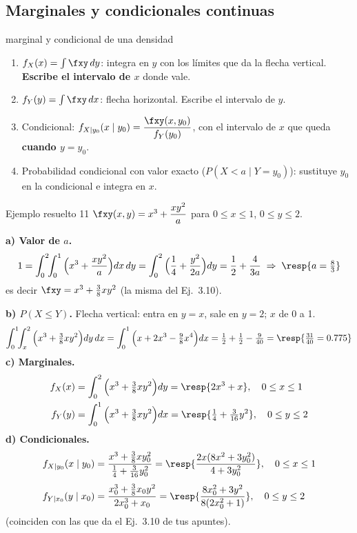 \subsection{Marginales y condicionales continuas}

\begin{receta}{marginal y condicional de una densidad}
\begin{enumerate}
\item $f_X(x)=\int \fxy\,dy$: integra en $y$ con los l\'imites que da la flecha vertical. \textbf{Escribe el intervalo de $x$} donde vale.
\item $f_Y(y)=\int \fxy\,dx$: flecha horizontal. Escribe el intervalo de $y$.
\item Condicional: $f_{X\mid y_0}(x\mid y_0)=\dfrac{\fxy(x,y_0)}{f_Y(y_0)}$, con el intervalo de $x$ que queda \textbf{cuando $y=y_0$}.
\item Probabilidad condicional con valor exacto ($P(X<a\mid Y=y_0)$): sustituye $y_0$ en la condicional e integra en $x$.
\end{enumerate}
\end{receta}

\begin{ejemplo}{Ejemplo resuelto 11 }
$\fxy(x,y)=x^3+\dfrac{xy^2}{a}$ para $0\le x\le1$, $0\le y\le2$.

\textbf{a) Valor de $a$.}
\[
1=\int_0^2\!\!\int_0^1\Big(x^3+\frac{xy^2}{a}\Big)dx\,dy=\int_0^2\Big(\frac14+\frac{y^2}{2a}\Big)dy=\frac12+\frac{4}{3a}
\;\Rightarrow\;\resp{a=\tfrac83}
\]
es decir $\fxy=x^3+\tfrac38xy^2$ (la misma del Ej.~3.10).

\textbf{b) $P(X\le Y)$.} Flecha vertical: entra en $y=x$, sale en $y=2$; $x$ de 0 a 1.
\[
\int_0^1\!\!\int_x^2\Big(x^3+\tfrac38xy^2\Big)dy\,dx=\int_0^1\Big(x+2x^3-\tfrac98x^4\Big)dx=\tfrac12+\tfrac12-\tfrac{9}{40}=\resp{\tfrac{31}{40}=0.775}
\]
\textbf{c) Marginales.}
\begin{align*}
f_X(x)&=\int_0^2\Big(x^3+\tfrac38xy^2\Big)dy=\resp{2x^3+x},\quad 0\le x\le1\\
f_Y(y)&=\int_0^1\Big(x^3+\tfrac38xy^2\Big)dx=\resp{\tfrac14+\tfrac{3}{16}y^2},\quad 0\le y\le2
\end{align*}
\textbf{d) Condicionales.}
\begin{align*}
f_{X\mid y_0}(x\mid y_0)&=\frac{x^3+\frac38xy_0^2}{\frac14+\frac{3}{16}y_0^2}=\resp{\frac{2x(8x^2+3y_0^2)}{4+3y_0^2}},\quad 0\le x\le1\\[3pt]
f_{Y\mid x_0}(y\mid x_0)&=\frac{x_0^3+\frac38x_0y^2}{2x_0^3+x_0}=\resp{\frac{8x_0^2+3y^2}{8(2x_0^2+1)}},\quad 0\le y\le2
\end{align*}
(coinciden con las que da el Ej.~3.10 de tus apuntes).
\end{ejemplo}

